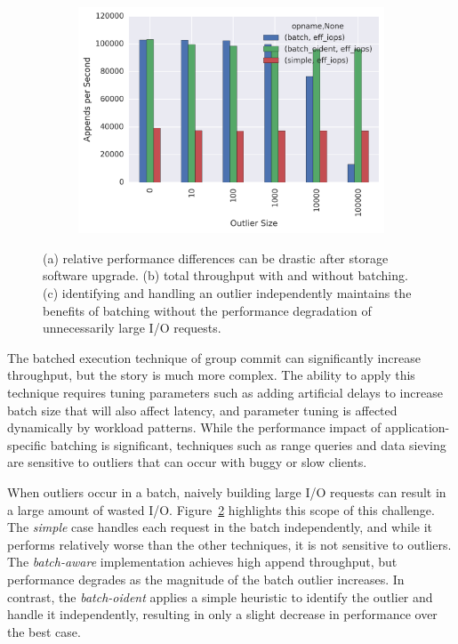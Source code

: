 \begin{figure}[t]
\begin{subfigure}[b]{.33\linewidth}
        \includegraphics[width=1.0\linewidth]{batching-outlier-detect.png}
        \caption{}
        \label{fig:batching-outlier}
    \end{subfigure}
    \caption{(a) relative performance differences can be drastic after storage
    software upgrade. (b) total throughput with and without batching.  (c)
    identifying and handling an outlier independently maintains the benefits
    of batching without the performance degradation of unnecessarily large I/O
    requests.}
\end{figure}


The batched execution technique of group commit can significantly increase
throughput, but the story is much more complex. The ability to apply this
technique requires tuning parameters such as adding artificial delays to
increase batch size that will also affect latency, and parameter tuning is
affected dynamically by workload patterns.  While the performance impact of
application-specific batching is significant, techniques such as range queries
and data sieving are sensitive to outliers that can occur with buggy or slow
clients.

When outliers occur in a batch, naively building large I/O requests can result
in a large amount of wasted I/O.  Figure~\ref{fig:batching-outlier} highlights
this scope of this challenge. The \emph{simple} case handles each request in
the batch independently, and while it performs relatively worse than the other
techniques, it is not sensitive to outliers. The \emph{batch-aware}
implementation achieves high append throughput, but performance degrades as
the magnitude of the batch outlier increases. In contrast, the
\emph{batch-oident} applies a simple heuristic to identify the outlier and
handle it independently, resulting in only a slight decrease in performance
over the best case.

